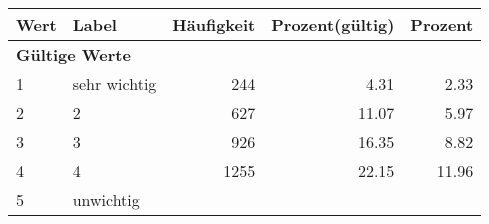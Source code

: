      \begin{longtable}{lXrrr}
     \toprule
     \textbf{Wert} & \textbf{Label} & \textbf{Häufigkeit} & \textbf{Prozent(gültig)} & \textbf{Prozent} \\
     \endhead
     \midrule
     \multicolumn{5}{l}{\textbf{Gültige Werte}}\\

     1 &
     \multicolumn{1}{X}{ sehr wichtig   } &


       \num{244} &
       \num[round-mode=places,round-precision=2]{4.31} &
         \num[round-mode=places,round-precision=2]{2.33} \\

     2 &
     \multicolumn{1}{X}{ 2   } &


       \num{627} &
       \num[round-mode=places,round-precision=2]{11.07} &
         \num[round-mode=places,round-precision=2]{5.97} \\

     3 &
     \multicolumn{1}{X}{ 3   } &


       \num{926} &
       \num[round-mode=places,round-precision=2]{16.35} &
         \num[round-mode=places,round-precision=2]{8.82} \\

     4 &
     \multicolumn{1}{X}{ 4   } &


       \num{1255} &
       \num[round-mode=places,round-precision=2]{22.15} &
         \num[round-mode=places,round-precision=2]{11.96} \\

     5 &
     \multicolumn{1}{X}{ unwichtig   } &



\end{longtable}
